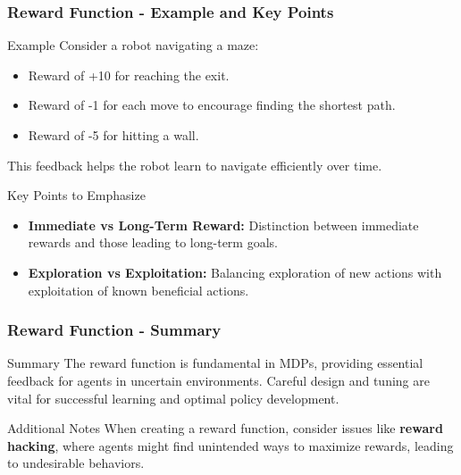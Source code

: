 \documentclass[aspectratio=169]{beamer}
\begin{document}
\begin{frame}[fragile]
    \frametitle{Reward Function - Example and Key Points}
    \begin{block}{Example}
        Consider a robot navigating a maze:
        \begin{itemize}
            \item Reward of +10 for reaching the exit.
            \item Reward of -1 for each move to encourage finding the shortest path.
            \item Reward of -5 for hitting a wall.
        \end{itemize}
        This feedback helps the robot learn to navigate efficiently over time.
    \end{block}

    \begin{block}{Key Points to Emphasize}
        \begin{itemize}
            \item \textbf{Immediate vs Long-Term Reward:} Distinction between immediate rewards and those leading to long-term goals.
            \item \textbf{Exploration vs Exploitation:} Balancing exploration of new actions with exploitation of known beneficial actions.
        \end{itemize}
    \end{block}
\end{frame}

\begin{frame}[fragile]
    \frametitle{Reward Function - Summary}
    \begin{block}{Summary}
        The reward function is fundamental in MDPs, providing essential feedback for agents in uncertain environments. 
        Careful design and tuning are vital for successful learning and optimal policy development.
    \end{block}
    \begin{block}{Additional Notes}
        When creating a reward function, consider issues like \textbf{reward hacking}, where agents might find unintended ways to maximize rewards, leading to undesirable behaviors.
    \end{block}
\end{frame}
\end{document}
